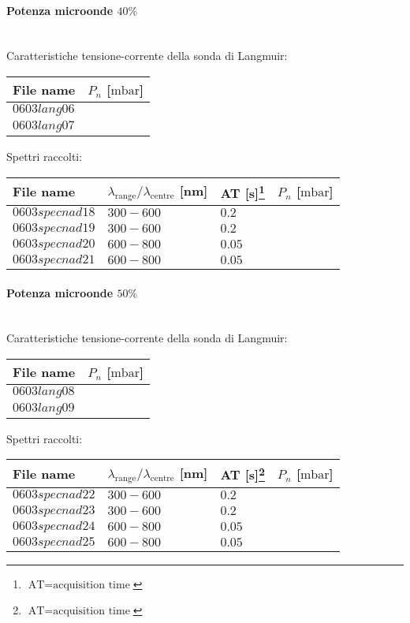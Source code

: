 \paragraph*{Potenza microonde $\text{40\%}$} ~\\
Caratteristiche tensione-corrente della sonda di Langmuir:
\begin{center}
\begin{tabular}{p{3cm}p{3cm}}
\toprule
File name	&$P_n$ [$\si{\milli\bar}$]\\
\midrule
$0603lang06$	&$  $\\
$0603lang07$	&$  $\\
\bottomrule
\end{tabular}
\end{center}

Spettri raccolti:
\begin{center}
\begin{tabular}{p{3cm}p{4cm}p{2cm}p{3cm}}
\toprule
File name	&$\lambda_\text{range}\text{/}\lambda_\text{centre}$ [nm] 	&AT [s]\footnote{$\text{AT}=\text{acquisition time}$} &$P_n$ [$\si{\milli\bar}$]\\
\midrule
$0603specnad18$	&$300-600$	&$0.2$		&$  $\\
$0603specnad19$	&$300-600$	&$0.2$		&$  $\\
$0603specnad20$	&$600-800$	&$0.05$		&$  $\\
$0603specnad21$	&$600-800$	&$0.05$		&$  $\\
\bottomrule
\end{tabular}
\end{center}

\paragraph*{Potenza microonde $\text{50\%}$} ~\\
Caratteristiche tensione-corrente della sonda di Langmuir:
\begin{center}
\begin{tabular}{p{3cm}p{3cm}}
\toprule
File name	&$P_n$ [$\si{\milli\bar}$]\\
\midrule
$0603lang08$	&$  $\\
$0603lang09$	&$  $\\
\bottomrule
\end{tabular}
\end{center}

Spettri raccolti:
\begin{center}
\begin{tabular}{p{3cm}p{4cm}p{2cm}p{3cm}}
\toprule
File name	&$\lambda_\text{range}\text{/}\lambda_\text{centre}$ [nm] 	&AT [s]\footnote{$\text{AT}=\text{acquisition time}$} &$P_n$ [$\si{\milli\bar}$]\\
\midrule
$0603specnad22$	&$300-600$	&$0.2$		&$  $\\
$0603specnad23$	&$300-600$	&$0.2$		&$  $\\
$0603specnad24$	&$600-800$	&$0.05$		&$  $\\
$0603specnad25$	&$600-800$	&$0.05$		&$  $\\
\bottomrule
\end{tabular}
\end{center}


